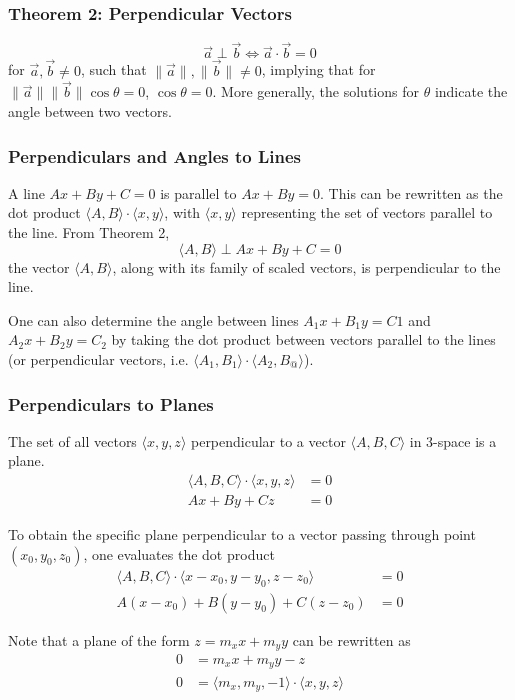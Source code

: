 \documentclass{article}
\newcommand{\vect}[1]{\ensuremath{\overrightarrow{#1}}}
\newcommand{\magnitude}[1]{\ensuremath{\lVert #1 \rVert}}
\newcommand{\magvect}[1]{\magnitude{\vect{#1}}}
\begin{document}
\subsubsection{Theorem 2: Perpendicular Vectors}
$$\vect{a} \perp \vect{b} \iff \vect{a} \cdot \vect{b} = 0$$ for $\vect{a}, \vect{b} \ne 0$, such that $\magvect{a}, \magvect{b} \ne 0$, implying that for $\magvect{a}\magvect{b}\cos{\theta} = 0$, $\cos{\theta} = 0$. More generally, the solutions for $\theta$ indicate the angle between two vectors.

\subsubsection{Perpendiculars and Angles to Lines}
A line $Ax + By + C = 0$ is parallel to $Ax + By = 0$. This can be rewritten as the dot product $\langle A, B \rangle \cdot \langle x, y \rangle$, with $\langle x, y \rangle$ representing the set of vectors parallel to the line. From Theorem 2,
$$\langle A, B \rangle \perp Ax + By + C = 0$$
the vector $\langle A, B \rangle$, along with its family of scaled vectors, is perpendicular to the line.

One can also determine the angle between lines $A_1x + B_1y = C1$ and $A_2x + B_2y = C_2$ by taking the dot product between vectors parallel to the lines (or perpendicular vectors, i.e. $\langle A_1, B_1 \rangle \cdot \langle A_2, B_@ \rangle$).

\subsubsection{Perpendiculars to Planes}
The set of all vectors $\langle x, y, z \rangle$ perpendicular to a vector $\langle A, B, C \rangle$ in 3-space is a plane.
\begin{align*}
    \langle A, B, C \rangle \cdot \langle x, y, z \rangle &= 0 \\
    Ax + By + Cz &= 0
\end{align*}

To obtain the specific plane perpendicular to a vector passing through point $(x_0, y_0, z_0)$, one evaluates the dot product
\begin{align*}
    \langle A, B, C \rangle \cdot \langle x - x_0, y - y_0, z - z_0 \rangle &= 0 \\
    A\left(x - x_0\right) + B\left(y - y_0\right) + C\left(z - z_0\right) &= 0
\end{align*}

Note that a plane of the form $z = m_xx + m_yy$ can be rewritten as
\begin{align*}
    0 &= m_xx + m_yy - z \\
    0 &= \langle m_x, m_y, -1 \rangle \cdot \langle x, y, z \rangle
\end{align*}
\end{document}
